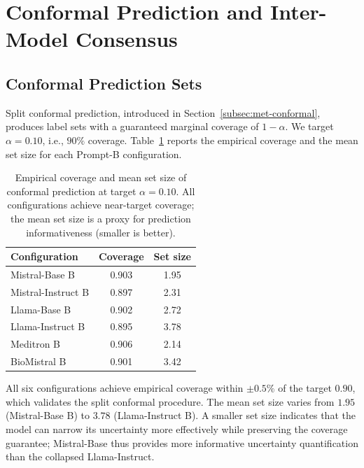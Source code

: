 \section{Conformal Prediction and Inter-Model Consensus}
\label{sec:res-conformal-consensus}

\subsection{Conformal Prediction Sets}
\label{subsec:res-conformal}

Split conformal prediction, introduced in 
Section~\ref{subsec:met-conformal}, produces label sets with a guaranteed 
marginal coverage of $1 - \alpha$. We target $\alpha = 0.10$, i.e., 
$90\%$ coverage. Table~\ref{tab:res-conformal} reports the empirical 
coverage and the mean set size for each Prompt-B configuration.

\begin{table}[htbp]
    \centering
    \caption{Empirical coverage and mean set size of conformal prediction 
        at target $\alpha = 0.10$. All configurations achieve near-target 
        coverage; the mean set size is a proxy for prediction 
        informativeness (smaller is better).}
    \label{tab:res-conformal}
    \small
    \begin{tabular}{@{}lcc@{}}
        \toprule
        \textbf{Configuration} & 
        \textbf{Coverage} & 
        \textbf{Set size} \\
        \midrule
        Mistral-Base B     & 0.903 & 1.95 \\
        Mistral-Instruct B & 0.897 & 2.31 \\
        Llama-Base B       & 0.902 & 2.72 \\
        Llama-Instruct B   & 0.895 & 3.78 \\
        Meditron B         & 0.906 & 2.14 \\
        BioMistral B       & 0.901 & 3.42 \\
        \bottomrule
    \end{tabular}
\end{table}

All six configurations achieve empirical coverage within $\pm 0.5\%$ of 
the target $0.90$, which validates the split conformal procedure. The 
mean set size varies from $1.95$ (Mistral-Base B) to $3.78$ 
(Llama-Instruct B). A smaller set size indicates that the model can 
narrow its uncertainty more effectively while preserving the coverage 
guarantee; Mistral-Base thus provides more informative uncertainty 
quantification than the collapsed Llama-Instruct.

